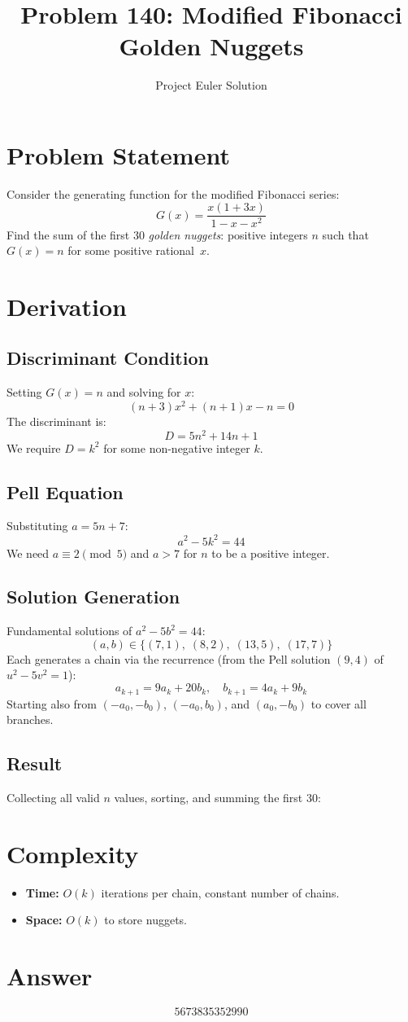 \documentclass[12pt]{article}
\title{Problem 140: Modified Fibonacci Golden Nuggets}
\author{Project Euler Solution}
\date{}
\begin{document}
\maketitle

\section{Problem Statement}
Consider the generating function for the modified Fibonacci series:
\[
G(x) = \frac{x(1 + 3x)}{1 - x - x^2}
\]
Find the sum of the first 30 \emph{golden nuggets}: positive integers $n$ such that $G(x) = n$ for some positive rational~$x$.

\section{Derivation}

\subsection{Discriminant Condition}
Setting $G(x) = n$ and solving for $x$:
\[
(n+3)x^2 + (n+1)x - n = 0
\]
The discriminant is:
\[
D = 5n^2 + 14n + 1
\]
We require $D = k^2$ for some non-negative integer $k$.

\subsection{Pell Equation}
Substituting $a = 5n + 7$:
\[
a^2 - 5k^2 = 44
\]
We need $a \equiv 2 \pmod{5}$ and $a > 7$ for $n$ to be a positive integer.

\subsection{Solution Generation}
Fundamental solutions of $a^2 - 5b^2 = 44$:
\[
(a, b) \in \{(7, 1),\; (8, 2),\; (13, 5),\; (17, 7)\}
\]
Each generates a chain via the recurrence (from the Pell solution $(9, 4)$ of $u^2 - 5v^2 = 1$):
\[
a_{k+1} = 9a_k + 20b_k, \quad b_{k+1} = 4a_k + 9b_k
\]
Starting also from $(-a_0, -b_0)$, $(-a_0, b_0)$, and $(a_0, -b_0)$ to cover all branches.

\subsection{Result}
Collecting all valid $n$ values, sorting, and summing the first 30:

\section{Complexity}
\begin{itemize}
\item \textbf{Time:} $O(k)$ iterations per chain, constant number of chains.
\item \textbf{Space:} $O(k)$ to store nuggets.
\end{itemize}

\section{Answer}

\[
\boxed{5673835352990}
\]
\end{document}
